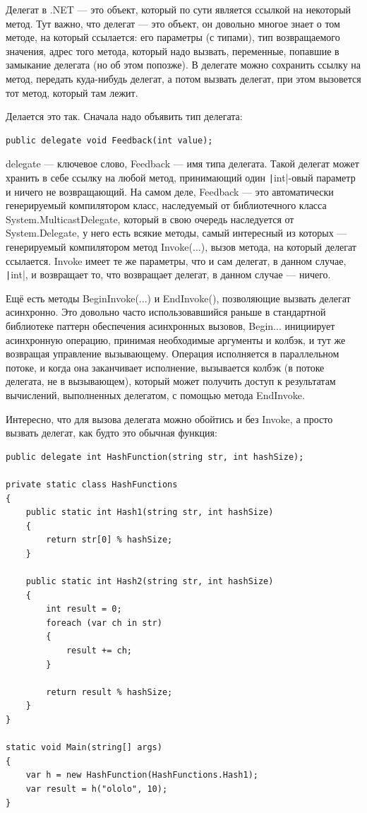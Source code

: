 \documentclass{../../text-style}
\begin{document}
Делегат в .NET --- это объект, который по сути является ссылкой на некоторый метод. Тут важно, что делегат --- это объект, он довольно многое знает о том методе, на который ссылается: его параметры (с типами), тип возвращаемого значения, адрес того метода, который надо вызвать, переменные, попавшие в замыкание делегата (но об этом попозже). В делегате можно сохранить ссылку на метод, передать куда-нибудь делегат, а потом вызвать делегат, при этом вызовется тот метод, который там лежит. 

Делается это так. Сначала надо объявить тип делегата:

\begin{verbatim}
public delegate void Feedback(int value);
\end{verbatim}

delegate --- ключевое слово, Feedback --- имя типа делегата. Такой делегат может хранить в себе ссылку на любой метод, принимающий один \texttt|int|-овый параметр и ничего не возвращающий. На самом деле, Feedback --- это автоматически генерируемый компилятором класс, наследуемый от библиотечного класса System.MulticastDelegate, который в свою очередь наследуется от System.Delegate, у него есть всякие методы, самый интересный из которых --- генерируемый компилятором метод Invoke(...), вызов метода, на который делегат ссылается. Invoke имеет те же параметры, что и сам делегат, в данном случае, \texttt|int|, и возвращает то, что возвращает делегат, в данном случае --- ничего. 

Ещё есть методы BeginInvoke(...) и EndInvoke(), позволяющие вызвать делегат асинхронно. Это довольно часто использовавшийся раньше в стандартной библиотеке паттерн обеспечения асинхронных вызовов, Begin... инициирует асинхронную операцию, принимая необходимые аргументы и колбэк, и тут же возвращая управление вызывающему. Операция исполняется в параллельном потоке, и когда она заканчивает исполнение, вызывается колбэк (в потоке делегата, не в вызывающем), который может получить доступ к результатам вычислений, выполненных делегатом, с помощью метода EndInvoke.

Интересно, что для вызова делегата можно обойтись и без Invoke, а просто вызвать делегат, как будто это обычная функция:

\begin{verbatim}
public delegate int HashFunction(string str, int hashSize);

private static class HashFunctions
{
    public static int Hash1(string str, int hashSize)
    {
        return str[0] % hashSize;
    }

    public static int Hash2(string str, int hashSize)
    {
        int result = 0;
        foreach (var ch in str)
        {
            result += ch;
        }

        return result % hashSize;
    }
}

static void Main(string[] args)
{
    var h = new HashFunction(HashFunctions.Hash1);
    var result = h("ololo", 10);
}
\end{verbatim}
\end{document}
